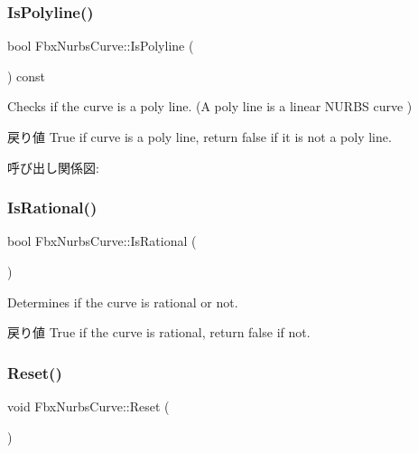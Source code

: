\subsubsection{\texorpdfstring{Is\+Polyline()}{IsPolyline()}}
{\footnotesize\ttfamily bool Fbx\+Nurbs\+Curve\+::\+Is\+Polyline (\begin{DoxyParamCaption}{ }\end{DoxyParamCaption}) const}

Checks if the curve is a poly line. (A poly line is a linear N\+U\+R\+BS curve )

\begin{DoxyReturn}{戻り値}
{\ttfamily True} if curve is a poly line, return {\ttfamily false} if it is not a poly line. 
\end{DoxyReturn}
呼び出し関係図\+:
\mbox{\label{class_fbx_nurbs_curve_a118714a2bcfd54a9e64b8cd2ed190f04}} 
\subsubsection{\texorpdfstring{Is\+Rational()}{IsRational()}}
{\footnotesize\ttfamily bool Fbx\+Nurbs\+Curve\+::\+Is\+Rational (\begin{DoxyParamCaption}{ }\end{DoxyParamCaption})}

Determines if the curve is rational or not. \begin{DoxyReturn}{戻り値}
{\ttfamily True} if the curve is rational, return {\ttfamily false} if not. 
\end{DoxyReturn}
\mbox{\label{class_fbx_nurbs_curve_ab65486c99f52b9c319583f43f14226bb}} 
\subsubsection{\texorpdfstring{Reset()}{Reset()}}
{\footnotesize\ttfamily void Fbx\+Nurbs\+Curve\+::\+Reset (\begin{DoxyParamCaption}{ }\end{DoxyParamCaption})\hspace{0.3cm}{\ttfamily [protected]}}

